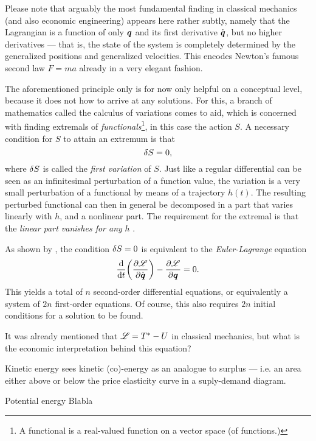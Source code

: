Please note that arguably the most fundamental finding in classical mechanics (and also economic engineering) appears here rather subtly, namely that the Lagrangian is a function of only \(\vb*{q}\) and its first derivative \(\dot{\vb*{q}}\), but no higher derivatives --- that is, the state of the system is completely determined by the generalized positions and generalized velocities. This encodes Newton's famous second law \(F = ma\) already in a very elegant fashion.

The aforementioned principle only is for now only helpful on a conceptual level, because it does not how to arrive at any solutions. For this, a branch of mathematics called the calculus of variations comes to aid, which is concerned with finding extremals of \emph{functionals}\footnote{A functional is a real-valued function on a vector space (of functions.)}, in this case the action \(S\). A necessary condition for \(S\) to attain an extremum is that 
\[ \var{S} = 0,\]
where \(\var{S}\) is called the \emph{first variation} of \(S\). Just like a regular differential can be seen as an infinitesimal perturbation of a function value, the variation is a very small perturbation of a functional by means of a trajectory \(h(t)\). The resulting perturbed functional can then in general be decomposed in a part that varies linearly with \(h\), and a nonlinear part. The requirement for the extremal is that the \emph{linear part vanishes for any} \(h\) \cite{Arnold1989}.

As shown by \citet{Landau1976}, the condition \(\var{S} = 0\) is equivalent to the \emph{Euler-Lagrange} equation
\[ \dv{}{t}\qty(\pdv{\ensuremath{\mathscr{L}}}{\ensuremath{\dot{\vb*{q}}}}) - \pdv{\ensuremath{\mathscr{L}}}{\ensuremath{\vb*{q}}} = 0. \]
This yields a total of \(n\) second-order differential equations, or equivalently a system of \(2n\) first-order equations. Of course, this also requires \(2n\) initial conditions for a solution to be found.

It was already mentioned that \(\mathscr{L} = T^* - U\) in classical mechanics, but what is the economic interpretation behind this equation?
\begin{econ}{Kinetic energy}
    \citet{Mendel2019} sees kinetic (co)-energy as an analogue to surplus --- i.e. an area either above or below the price elasticity curve in a suply-demand diagram.
\end{econ}

\begin{econ}{Potential energy}
    Blabla
\end{econ}


